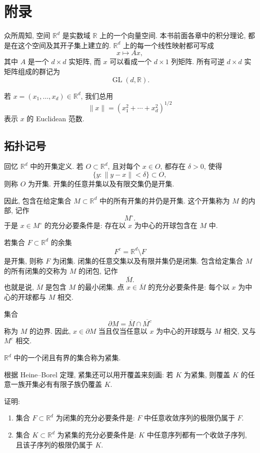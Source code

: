 \appendix

\chapter{附录}
\label{app:basic-notation-topology}

众所周知, 空间 \(\mathbb R^d\) 是实数域 \(\mathbb R\) 上的一个向量空间. 本书前面各章中的积分理论, 都是在这个空间及其开子集上建立的. \(\mathbb R^d\) 上的每一个线性映射都可写成
\[
x\longmapsto Ax,
\]
其中 \(A\) 是一个 \(d\times d\) 实矩阵, 而 \(x\) 可以看成一个 \(d\times 1\) 列矩阵. 所有可逆 \(d\times d\) 实矩阵组成的群记为
\[
\operatorname{GL}(d,\mathbb R).
\]

若 \(x=(x_1,\ldots,x_d)\in\mathbb R^d\), 我们总用
\[
\|x\|=(x_1^2+\cdots+x_d^2)^{1/2}
\]
表示 \(x\) 的 Euclidean 范数.

\section{拓扑记号}
\label{app:topological-notation}

回忆 \(\mathbb R^d\) 中的开集定义. 若 \(O\subset\mathbb R^d\), 且对每个 \(x\in O\), 都存在 \(\delta>0\), 使得
\[
\{y:\|y-x\|<\delta\}\subset O,
\]
则称 \(O\) 为开集. 开集的任意并集以及有限交集仍是开集.

因此, 包含在给定集合 \(M\subset\mathbb R^d\) 中的所有开集的并仍是开集. 这个开集称为 \(M\) 的内部, 记作
\[
M^\circ.
\]
于是 \(x\in M^\circ\) 的充分必要条件是: 存在以 \(x\) 为中心的开球包含在 \(M\) 中.

若集合 \(F\subset\mathbb R^d\) 的余集
\[
F^c=\mathbb R^d\setminus F
\]
是开集, 则称 \(F\) 为闭集. 闭集的任意交集以及有限并集仍是闭集. 包含给定集合 \(M\) 的所有闭集的交称为 \(M\) 的闭包, 记作
\[
\overline M.
\]
也就是说, \(\overline M\) 是包含 \(M\) 的最小闭集. 点 \(x\in\overline M\) 的充分必要条件是: 每个以 \(x\) 为中心的开球都与 \(M\) 相交.

集合
\[
\partial M=\overline M\cap \overline{M^c}
\]
称为 \(M\) 的边界. 因此, \(x\in\partial M\) 当且仅当任意以 \(x\) 为中心的开球既与 \(M\) 相交, 又与 \(M^c\) 相交.

\begin{defn}[紧集]
	\label{def:compact-set-appendix}
	\(\mathbb R^d\) 中的一个闭且有界的集合称为紧集.
\end{defn}

根据 Heine--Borel 定理, 紧集还可以用开覆盖来刻画: 若 \(K\) 为紧集, 则覆盖 \(K\) 的任意一族开集必有有限子族仍覆盖 \(K\).

\begin{exer}
	\label{exer:closed-sequential-characterization}
	证明:
	\begin{enumerate}
		\item 集合 \(F\subset\mathbb R^d\) 为闭集的充分必要条件是: \(F\) 中任意收敛序列的极限仍属于 \(F\).
		\item 集合 \(K\subset\mathbb R^d\) 为紧集的充分必要条件是: \(K\) 中任意序列都有一个收敛子序列, 且该子序列的极限仍属于 \(K\).
	\end{enumerate}
\end{exer}

